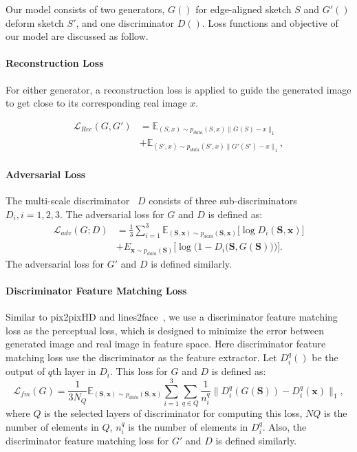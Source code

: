 
Our model consists of two generators, $G()$ for edge-aligned sketch $S$ and $G'()$ deform sketch $S'$, and one discriminator $D()$. Loss functions and objective of our model are discussed as follow.

\paragraph{Reconstruction Loss}
For either generator, a reconstruction loss is applied to guide the generated image to get close to its corresponding real image $x$.

\begin{equation}
\label{eqn:loss_rec}
\begin{aligned}
\mathcal{L}_{Rec}(G, G') &=\mathbb{E}_{(S, x)\sim p_{data}(S,x)\|G(S) - x\|_1} \\
&+ \mathbb{E}_{(S', x)\sim p_{data}(S',x)\|G'(S') - x\|_1},
\end{aligned}
\end{equation}

\paragraph{Adversarial Loss}
The multi-scale discriminator~\cite{pix2pixHD} $D$ consists of three sub-discriminators $D_i, i=1,2,3$.  The adversarial loss for $G$ and $D$ is defined as:
\begin{equation}
\label{eqn:new_loss_adv}
\begin{aligned}
\mathcal{L}_{adv}(G;D) &=\frac{1}{3}\sum_{i=1}^{3}\mathbb{E}_{(\bm{S},\bm{x})\sim p_{data}(\bm{S},\bm{x})}\big[\log D_i(\bm{S},\bm{x})\big] \\
& + E_{\bm{x}\sim p_{data}(\bm{S})}\Big[\log \Big(1-D_i \big(\bm{S},G(\bm{S})\big)\Big)\Big].
\end{aligned}
\end{equation}
The adversarial loss for $G'$ and $D$ is defined similarly.

\paragraph{Discriminator Feature Matching Loss} Similar to pix2pixHD\cite{pix2pixHD} and lines2face~\cite{Lines2Face}, we use a discriminator feature matching loss as the perceptual loss, which is designed to minimize the error between generated image and real image in feature space. Here discriminator feature matching loss use the discriminator as the feature extractor. Let $D^q_i()$ be the output of $q$th layer in $D_i$. This loss for $G$ and $D$ is defined as:
\begin{equation}
\label{eqn:feature_matching_loss}
\mathcal{L}_{fm}(G)=\frac{1}{3N_Q}\mathbb{E}_{(\bm{S},\bm{x})\sim p_{data}(\bm{S},\bm{x})}\sum_{i=1}^{3}\sum_{q\in Q} \frac{1}{n_i^q} \|D^q_i(G(\bm{S}))-D^q_i(\bm{x})\|_1 ,
\end{equation}
where $Q$ is the selected layers of discriminator for computing this loss, $NQ$ is the number of elements in $Q$, $n^q_i$ is the number of elements in $D^q_i$.
Also, the discriminator feature matching loss for $G'$ and $D$ is defined similarly.

